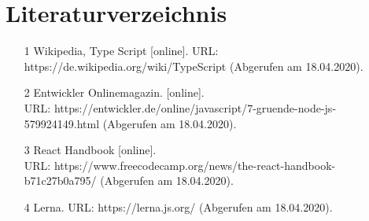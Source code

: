 \documentclass[11pt,a4paper,titlepage]{article}
\begin{document}
\section{Literaturverzeichnis}

\begin{itemize}
\item [1] Wikipedia, Type Script [online]. URL: https://de.wikipedia.org/wiki/TypeScript (Abgerufen am 18.04.2020).
\item [2] Entwickler Onlinemagazin.  [online]. \\URL: https://entwickler.de/online/javascript/7-gruende-node-js-579924149.html (Abgerufen am 18.04.2020).
\item [3] React Handbook [online]. \\URL: https://www.freecodecamp.org/news/the-react-handbook-b71c27b0a795/ (Abgerufen am 18.04.2020).
\item [4] Lerna. URL: https://lerna.js.org/ (Abgerufen am 18.04.2020).
\end{itemize}
\end{document}
